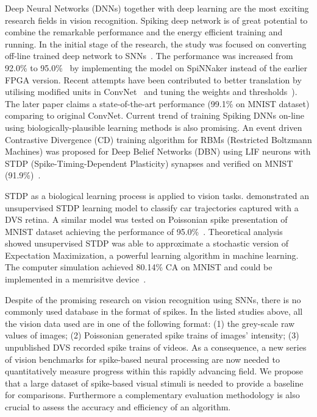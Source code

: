 Deep Neural Networks (DNNs) together with deep learning are the most exciting research fields in vision recognition.
Spiking deep network is of great potential to combine the remarkable performance and the energy efficient training and running.
In the initial stage of the research, the study was focused on converting off-line trained deep network to SNNs~\citep{o2013real}.
The performance was increased from 92.0\% to 95.0\%~\citep{Stromatias2015scalable} by implementing the model on SpiNNaker instead of the earlier FPGA version.
Recent attempts have been contributed to better translation by utilising modified units in ConvNet~\citep{cao2015spiking} and tuning the weights and thresholds~\citep{Diehl2015fast}).
The later paper claims a state-of-the-art performance (99.1\% on MNIST dataset) comparing to original ConvNet.
Current trend of training Spiking DNNs on-line using biologically-plausible learning methods is also promising.
An event driven Contrastive Divergence (CD) training algorithm for RBMs (Restricted Boltzmann Machines) was proposed for Deep Belief Networks (DBN) using LIF neurons with STDP (Spike-Timing-Dependent Plasticity) synapses and verified on MNIST (91.9\%)~\citep{neftci2013event}.

STDP as a biological learning process is applied to vision tasks.
\cite{bichler2012extraction} demonstrated an unsupervised STDP learning model to classify car trajectories captured with a DVS retina. 
A similar model was tested on Poissonian spike presentation of MNIST dataset achieving the performance of 95.0\%~\citep{Diehl2015unsupervised}.
Theoretical analysis~\citep{nessler2013bayesian} showed unsupervised STDP was able to approximate a stochastic version of Expectation Maximization, a powerful learning algorithm in machine learning.
The computer simulation achieved 80.14\% CA on MNIST and could be implemented in a memrisitve device~\citep{bill2014compound}. 

Despite of the promising research on vision recognition using SNNs, there is no commonly used database in the format of spikes.
In the listed studies above, all the vision data used are in one of the following format:
(1) the grey-scale raw values of images;
(2) Poissonian generated spike trains of images' intensity;
(3) unpublished DVS recorded spike trains of videos.
As a consequence, a new series of vision benchmarks for spike-based neural processing are now needed to quantitatively measure progress within this rapidly advancing field.
We propose that a large dataset of spike-based visual stimuli is needed to provide a baseline for comparisons.
Furthermore a complementary evaluation methodology is also crucial to assess the accuracy and efficiency of an algorithm.

